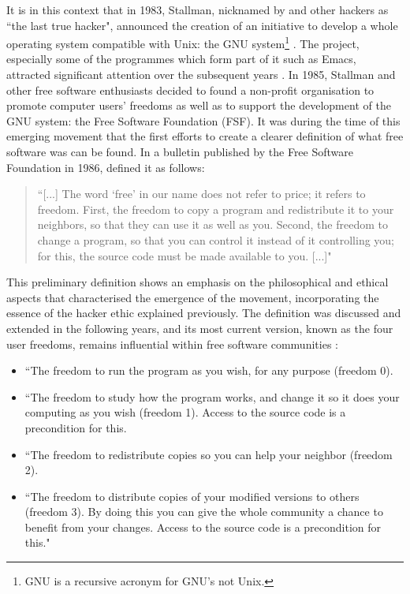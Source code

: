 It is in this context that in 1983, Stallman, nicknamed by \textcite{levy1984hackers} and other hackers \parencite{Raymond2001} as ``the last true hacker", announced the creation of an initiative to develop a whole operating system compatible with Unix: the GNU system\footnote{GNU is a recursive acronym for GNU's not Unix.} \parencite{fsf-gnu-initial:2014:Online}. The project, especially some of the programmes which form part of it such as Emacs, attracted significant attention over the subsequent years \parencite[18]{stallman2002free}. In 1985, Stallman and other free software enthusiasts decided to found a non-profit organisation to promote computer users' freedoms as well as to support the development of the GNU system: the Free Software Foundation (FSF). It was during the time of this emerging movement that the first efforts to create a clearer definition of what free software was can be found. In a bulletin published by the Free Software Foundation in 1986, \textcite{gnu-bulletin:Online} defined it as follows:

\begin{quotation}
``[...] The word `free' in our name does not refer to price; it refers to
freedom.  First, the freedom to copy a program and redistribute it to
your neighbors, so that they can use it as well as you.  Second, the
freedom to change a program, so that you can control it instead of it
controlling you; for this, the source code must be made available to
you. [...]"
\end{quotation}

This preliminary definition shows an emphasis on the philosophical and ethical aspects that characterised the emergence of the movement, incorporating the essence of the hacker ethic explained previously. The definition was discussed and extended in the following years, and its most current version, known as the four user freedoms, remains influential within free software communities \parencite{what-is-fs:Online}:

\begin{itemize}
	\item ``The freedom to run the program as you wish, for any purpose (freedom 0).
	\item ``The freedom to study how the program works, and change it so it does your computing as you wish (freedom 1). Access to the source code is a precondition for this. 
	\item ``The freedom to redistribute copies so you can help your neighbor (freedom 2). 
	\item ``The freedom to distribute copies of your modified versions to others (freedom 3). By doing this you can give the whole community a chance to benefit from your changes. Access to the source code is a precondition for this." 
\end{itemize}

